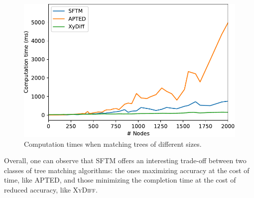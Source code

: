 \begin{figure}%
    \centering
    \includegraphics[width=.85\linewidth]{tree-matching/graphs/computationTime}
    \caption{Computation times when matching trees of different sizes.}
    \label{fig:computation_time}
\end{figure}%

Overall, one can observe that SFTM offers an interesting trade-off between two classes of tree matching algorithms: the ones maximizing accuracy at the cost of time, like APTED, and those minimizing the completion time at the cost of reduced accuracy, like \textsc{XyDiff}.


    

